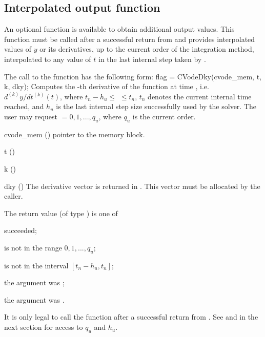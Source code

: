 
\subsection{Interpolated output function}\label{ss:optional_dky}

An optional function  is available to obtain additional output values.  
This function must be called after a successful return from  and provides 
interpolated values of $y$ or its derivatives, up to the current order of the 
integration method, interpolated to any value of $t$ in the last internal step 
taken by {\cvode}.

The call to the  function has the following form:
{
  flag = CVodeDky(cvode\_mem, t, k, dky);
}
{
  Computes the -th derivative of the  function at      
  time , i.e. $d^{(k)}y/dt^{(k)} (t)$, where $t_n - h_u \le$  $\le t_n$, 
  $t_n$ denotes the current internal time reached, and $h_u$ is the 
  last internal step size successfully used by the solver. 
  The user may request  $= 0, 1, ..., q_u$, where $q_u$ is the 
  current order. 
}
{
  \begin{args}
  \item[cvode\_mem] ()
    pointer to the {\cvode} memory block.
  \item[t] ()
  \item[k] ()
  \item[dky] ()
    The derivative vector is returned in . 
    This vector must be allocated by the caller. 
  \end{args}
}
{
  The return value  (of type ) is one of
  \begin{args} 
  \item[\Id{OKAY}]
     succeeded;
  \item[\Id{BAD\_K}] 
     is not in the range $0, 1, ..., q_u$;
  \item[\Id{BAD\_T}] 
     is not in the interval $[t_n - h_u , t_n]$;
  \item[\Id{BAD\_DKY}] 
    the  argument was ;
  \item[\Id{DKY\_NO\_MEM}] 
    the  argument was .
  \end{args}

}
{
  It is only legal to call the function  after a 
  successful return from . See  
  and  in the next section for access to 
  $q_u$ and $h_u$.
}

